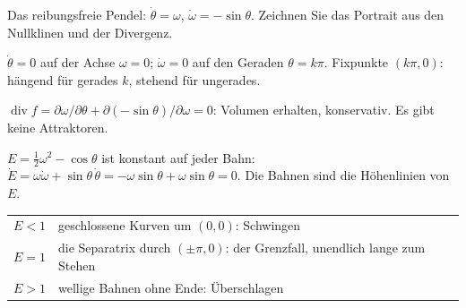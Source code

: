 \begin{aufgabe}
Das reibungsfreie Pendel: $\dot\theta = \omega$, $\dot\omega = -\sin\theta$. Zeichnen Sie das Portrait aus den Nullklinen und der Divergenz.

\loesung
{}
$\dot\theta = 0$ auf der Achse $\omega = 0$; $\dot\omega = 0$ auf den Geraden $\theta = k\pi$. Fixpunkte $(k\pi, 0)$: hängend für gerades $k$, stehend für ungerades.

$\operatorname{div} f = \partial\omega/\partial\theta + \partial(-\sin\theta)/\partial\omega = 0$: Volumen erhalten, konservativ. Es gibt keine Attraktoren.

$E = \tfrac12\omega^{2} - \cos\theta$ ist konstant auf jeder Bahn: $\dot E = \omega\dot\omega + \sin\theta\,\dot\theta = -\omega\sin\theta + \omega\sin\theta = 0$. Die Bahnen sind die Höhenlinien von $E$.

\begin{center}
{\small
\renewcommand{\arraystretch}{1.48}
\begin{tabular}{@{}P{2.4cm}P{6.2cm}@{}}
\toprule
$E < 1$ & geschlossene Kurven um $(0,0)$: Schwingen\\
$E = 1$ & die Separatrix durch $(\pm\pi,0)$: der Grenzfall, unendlich lange zum Stehen\\
$E > 1$ & wellige Bahnen ohne Ende: Überschlagen\\
\bottomrule
\end{tabular}}
\end{center}

\begin{center}
\begin{minipage}{0.88\textwidth}
\end{minipage}
\end{center}
\end{aufgabe}

